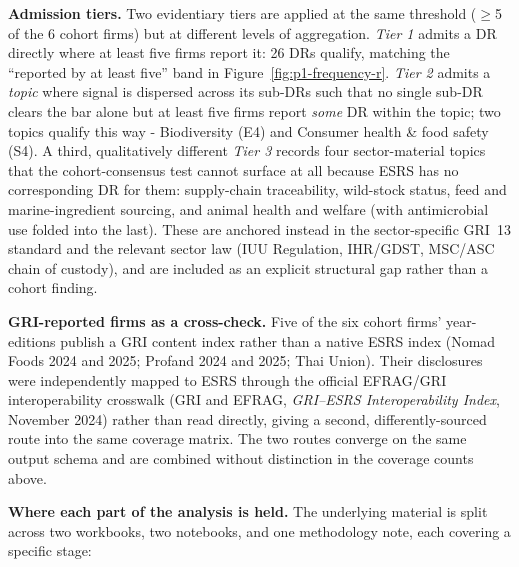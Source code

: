 \documentclass[
]{article}
\begin{document}
\textbf{Admission tiers.} Two evidentiary tiers are applied at the same
threshold ($\geq$5 of the 6 cohort firms) but at different levels of
aggregation. \emph{Tier 1} admits a DR directly where at least five firms
report it: 26 DRs qualify, matching the ``reported by at least five'' band in
Figure~\ref{fig:p1-frequency-r}. \emph{Tier 2} admits a \emph{topic} where
signal is dispersed across its sub-DRs such that no single sub-DR clears the
bar alone but at least five firms report \emph{some} DR within the topic;
two topics qualify this way - Biodiversity (E4) and Consumer health \&
food safety (S4). A third, qualitatively different \emph{Tier 3} records
four sector-material topics that the cohort-consensus test cannot surface at
all because ESRS has no corresponding DR for them: supply-chain traceability,
wild-stock status, feed and marine-ingredient sourcing, and animal health and
welfare (with antimicrobial use folded into the last). These are anchored instead in the sector-specific GRI~13
standard and the relevant sector law (IUU Regulation, IHR/GDST, MSC/ASC chain
of custody), and are included as an explicit structural gap rather than a
cohort finding.

\textbf{GRI-reported firms as a cross-check.} Five of the six cohort firms'
year-editions publish a GRI content index rather than a native ESRS index
(Nomad Foods 2024 and 2025; Profand 2024 and 2025; Thai Union). Their
disclosures were independently mapped to ESRS through the official EFRAG/GRI
interoperability crosswalk (GRI and EFRAG, \emph{GRI--ESRS Interoperability
Index}, November 2024) rather than read directly, giving a second,
differently-sourced route into the same coverage matrix. The two routes
converge on the same output schema and are combined without distinction in
the coverage counts above.

\textbf{Where each part of the analysis is held.} The underlying material is
split across two workbooks, two notebooks, and one methodology note, each
covering a specific stage:
\end{document}
